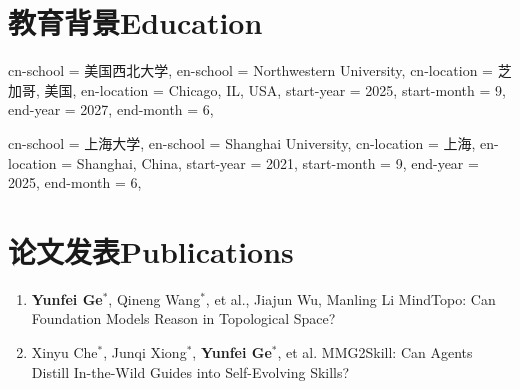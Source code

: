 \documentclass{resume}
\begin{document}


\section{\iflangcn 教育背景\else Education\fi}

\begin{education}{
  cn-school   = {美国西北大学},
  en-school   = {Northwestern University},
  cn-location = {芝加哥, 美国},
  en-location = {Chicago, IL, USA},
  start-year  = 2025, start-month = 9,
  end-year    = 2027, end-month   = 6,
}
\end{education}

\begin{education}{
  cn-school   = {上海大学},
  en-school   = {Shanghai University},
  cn-location = {上海},
  en-location = {Shanghai, China},
  start-year  = 2021, start-month = 9,
  end-year    = 2025, end-month   = 6,
}
\end{education}

\section{\iflangcn 论文发表\else Publications\fi}
\begin{enumerate}
  \item {}%
    {\textcolor[HTML]{CC7260}{\textbf{Yunfei Ge}$^*$}, Qineng Wang$^*$, et al., Jiajun Wu, Manling Li}%
    {MindTopo: Can Foundation Models Reason in Topological Space?}
  \item {}%
    {Xinyu Che$^*$, Junqi Xiong$^*$, \textcolor[HTML]{CC7260}{\textbf{Yunfei Ge}$^*$}, et al.}%
    {MMG2Skill: Can Agents Distill In-the-Wild Guides into Self-Evolving Skills?}
\end{enumerate}
\end{document}
